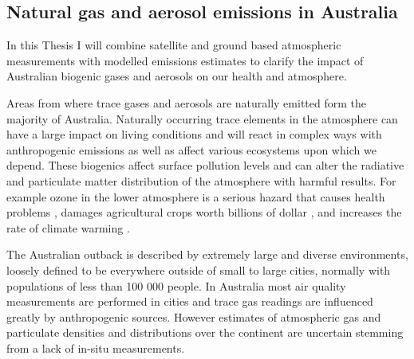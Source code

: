 \subsection{Natural gas and aerosol emissions in Australia}

In this Thesis I will combine satellite and ground based atmospheric measurements with modelled emissions estimates to clarify the impact of Australian biogenic gases and aerosols on our health and atmosphere.

Areas from where trace gases and aerosols are naturally emitted form the majority of Australia.
Naturally occurring trace elements in the atmosphere can have a large impact on living conditions and will react in complex ways with anthropogenic emissions as well as affect various ecosystems upon which we depend.
These biogenics affect surface pollution levels and can alter the radiative and particulate matter distribution of the atmosphere with harmful results.
For example ozone in the lower atmosphere is a serious hazard that causes health problems \cite{Hsieh_2013}, damages agricultural crops worth billions of dollar \cite{Avnery_2011}, and increases the rate of climate warming \cite{IPCC_2013_chap8}.

The Australian outback is described by extremely large and diverse environments, loosely defined to be everywhere outside of small to large cities, normally with populations of less than 100 000 people.
In Australia most air quality measurements are performed in cities and trace gas readings are influenced greatly by anthropogenic sources.
However estimates of atmospheric gas and particulate densities and distributions over the continent are uncertain stemming from a lack of in-situ measurements.

  